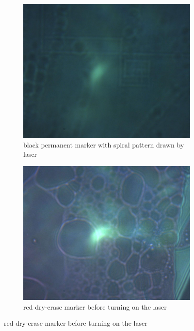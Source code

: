 \begin{figure}
  \centering
  \begin{subfigure}{.45\textwidth}
    \centering
    \includegraphics[width=\textwidth]{./data/source/schwarz.jpg}
    \caption{black permanent marker with spiral pattern drawn by laser}
  \end{subfigure}
  \begin{subfigure}{.45\textwidth}
    \centering
    \includegraphics[width=\textwidth]{./img/red-before.jpg}
    \caption{red dry-erase marker before turning on the laser}
  \end{subfigure}

\end{figure}
